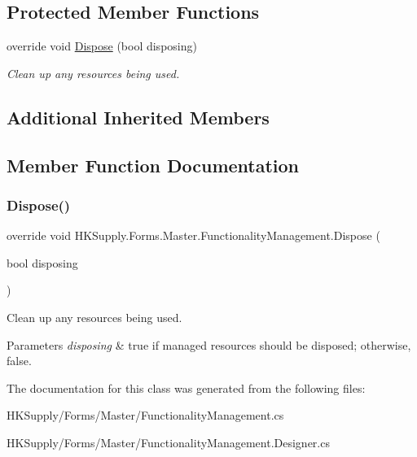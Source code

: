 \subsection*{Protected Member Functions}
\begin{DoxyCompactItemize}
\item 
override void \mbox{\hyperlink{class_h_k_supply_1_1_forms_1_1_master_1_1_functionality_management_a36e30f6560cd85f1d5369dadd79487d4}{Dispose}} (bool disposing)
\begin{DoxyCompactList}\small\item\em Clean up any resources being used. \end{DoxyCompactList}\end{DoxyCompactItemize}
\subsection*{Additional Inherited Members}


\subsection{Member Function Documentation}
\mbox{\label{class_h_k_supply_1_1_forms_1_1_master_1_1_functionality_management_a36e30f6560cd85f1d5369dadd79487d4}} 
\subsubsection{\texorpdfstring{Dispose()}{Dispose()}}
{\footnotesize\ttfamily override void H\+K\+Supply.\+Forms.\+Master.\+Functionality\+Management.\+Dispose (\begin{DoxyParamCaption}\item[{bool}]{disposing }\end{DoxyParamCaption})\hspace{0.3cm}{\ttfamily [protected]}}



Clean up any resources being used. 


\begin{DoxyParams}{Parameters}
{\em disposing} & true if managed resources should be disposed; otherwise, false.\\
\hline
\end{DoxyParams}


The documentation for this class was generated from the following files\+:\begin{DoxyCompactItemize}
\item 
H\+K\+Supply/\+Forms/\+Master/Functionality\+Management.\+cs\item 
H\+K\+Supply/\+Forms/\+Master/Functionality\+Management.\+Designer.\+cs\end{DoxyCompactItemize}
